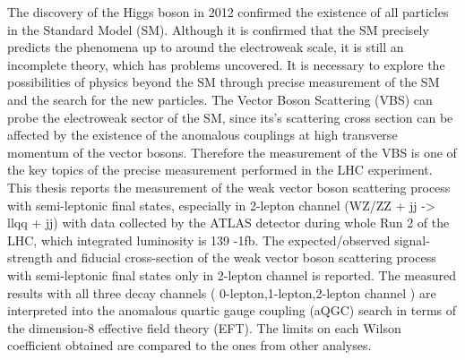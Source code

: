 The discovery of the Higgs boson in 2012 confirmed the existence of all particles in the Standard Model (SM). Although it is confirmed that the SM precisely predicts the phenomena up to around the electroweak scale, it is still an incomplete theory, which has problems uncovered. It is necessary to explore the possibilities of physics beyond the SM through precise measurement of the SM and the search for the new particles. 
The Vector Boson Scattering (VBS) can probe the electroweak sector of the SM, since its’s scattering cross section can be affected by the existence of the anomalous couplings at high transverse momentum of the vector bosons. Therefore the measurement of the VBS is one of the key topics of the precise measurement performed in the LHC experiment.
This thesis reports the measurement of the weak vector boson scattering process with semi-leptonic final states, especially in 2-lepton channel (WZ/ZZ + jj -> llqq + jj) with data collected by the ATLAS detector during whole Run 2 of the LHC, which integrated luminosity is 139 -1fb.
The expected/observed signal-strength and fiducial cross-section of the weak vector boson scattering process with semi-leptonic final states only in 2-lepton channel is reported.
 The measured results with all three decay channels ( 0-lepton,1-lepton,2-lepton channel ) are interpreted into the anomalous quartic gauge coupling (aQGC) search in terms of the dimension-8 effective field theory (EFT). The limits on each Wilson coefficient obtained are compared to the ones from other analyses.

